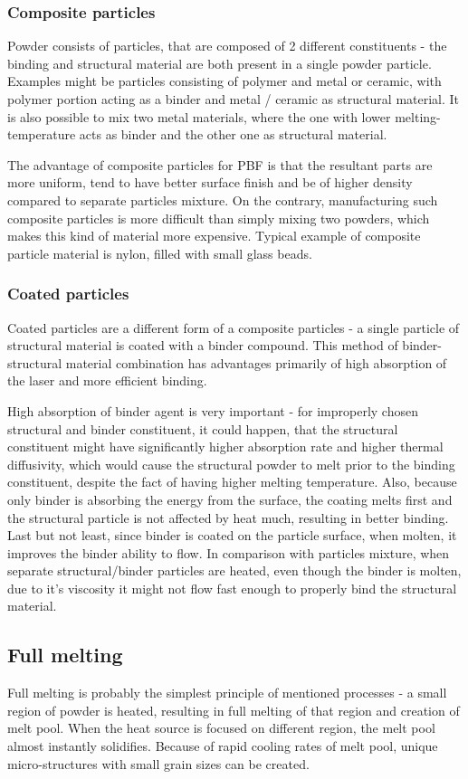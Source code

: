 \documentclass[a4paper, 11pt, reqno]{report}
\begin{document}
\subsubsection{Composite particles}
Powder consists of particles, that are composed of 2 different constituents - the binding and structural material are both present in a single powder particle. Examples might be particles consisting of polymer and metal or ceramic, with polymer portion acting as a binder and metal / ceramic as structural material. It is also possible to mix two metal materials, where the one with lower melting-temperature acts as binder and the other one as structural material.

	The advantage of composite particles for PBF is that the resultant parts are more uniform, tend to have better surface finish and be of higher density compared to separate particles mixture. On the contrary, manufacturing such composite particles is more difficult than simply mixing two powders, which makes this kind of material more expensive. Typical example of composite particle material is nylon, filled with small glass beads.
\subsubsection{Coated particles}
Coated particles are a different form of a composite particles - a single particle of structural material is coated with a binder compound. This method of binder-structural material combination has advantages primarily of high absorption of the laser and more efficient binding.

	High absorption of binder agent is very important - for improperly chosen structural and binder constituent, it could happen, that the structural constituent might have significantly higher absorption rate and higher thermal diffusivity, which would cause the structural powder to melt prior to the binding constituent, despite the fact of having higher melting temperature. Also, because only binder is absorbing the energy from the surface, the coating melts first and the structural particle is not affected by heat much, resulting in better binding. Last but not least, since binder is coated on the particle surface, when molten, it improves the binder ability to flow. In comparison with particles mixture, when separate structural/binder particles are heated, even though the binder is molten, due to it's viscosity it might not flow fast enough to properly bind the structural material.

\subsection{Full melting}
Full melting is probably the simplest principle of mentioned processes - a small region of powder is heated, resulting in full melting of that region and creation of melt pool. When the heat source is focused on different region, the melt pool almost instantly solidifies. Because of rapid cooling rates of melt pool, unique micro-structures with small grain sizes can be created.
\end{document}
